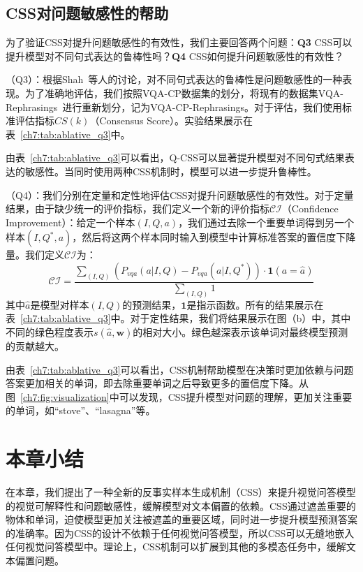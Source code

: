 \subsection{CSS对问题敏感性的帮助}
为了验证CSS对提升问题敏感性的有效性，我们主要回答两个问题：\textbf{Q3} CSS可以提升模型对不同句式表达的鲁棒性吗？\textbf{Q4} CSS如何提升问题敏感性的有效性？

\textbf{}（Q3）：根据Shah~\cite{shah2019cycle}等人的讨论，对不同句式表达的鲁棒性是问题敏感性的一种表现。为了准确地评估，我们按照VQA-CP数据集的划分，将现有的数据集VQA-Rephrasings~\cite{shah2019cycle}进行重新划分，记为VQA-CP-Rephrasings。对于评估，我们使用标准评估指标$CS(k)$（Consensus Score）。实验结果展示在表~\ref{ch7:tab:ablative_q3}中。

由表~\ref{ch7:tab:ablative_q3}可以看出，Q-CSS可以显著提升模型对不同句式结果表达的敏感性。当同时使用两种CSS机制时，模型可以进一步提升鲁棒性。

\textbf{}（Q4）：我们分别在定量和定性地评估CSS对提升问题敏感性的有效性。对于定量结果，由于缺少统一的评价指标，我们定义一个新的评价指标$\mathcal{CI}$（Confidence Improvement）：给定一个样本$(I, Q, a)$，我们通过去除一个重要单词得到另一个样本$(I, Q^*, a)$，然后将这两个样本同时输入到模型中计算标准答案的置信度下降量。我们定义$\mathcal{CI}$为：
\begin{equation}
\mathcal{CI} = \frac{\sum_{(I, Q)}  (P_{vqa}(a | I, Q) - P_{vqa}(a | I, Q^*)) \cdot \mathbf{1}(a = \hat{a}) }{\sum_{(I, Q)} 1}
\end{equation}
其中$\hat{a}$是模型对样本$(I, Q)$的预测结果，$\mathbf{1}$是指示函数。所有的结果展示在表~\ref{ch7:tab:ablative_q3}中。对于定性结果，我们将结果展示在图（b）中，其中不同的绿色程度表示$s(\hat{a}, \bm{w})$的相对大小。绿色越深表示该单词对最终模型预测的贡献越大。

由表~\ref{ch7:tab:ablative_q3}可以看出，CSS机制帮助模型在决策时更加依赖与问题答案更加相关的单词，即去除重要单词之后导致更多的置信度下降。从图~\ref{ch7:fig:visualization}中可以发现，CSS提升模型对问题的理解，更加关注重要的单词，如“stove”、“lasagna”等。


\section{本章小结}
在本章，我们提出了一种全新的反事实样本生成机制（CSS）来提升视觉问答模型的视觉可解释性和问题敏感性，缓解模型对文本偏置的依赖。CSS通过遮盖重要的物体和单词，迫使模型更加关注被遮盖的重要区域，同时进一步提升模型预测答案的准确率。因为CSS的设计不依赖于任何视觉问答模型，所以CSS可以无缝地嵌入任何视觉问答模型中。理论上，CSS机制可以扩展到其他的多模态任务中，缓解文本偏置问题。
